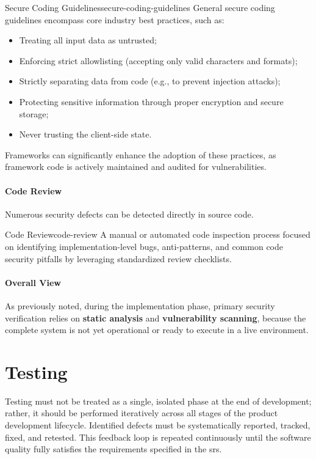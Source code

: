 \begin{concept}{Secure Coding Guidelines}{secure-coding-guidelines}
    General secure coding guidelines encompass core industry best practices, such as:
    \begin{itemize}
        \item Treating all input data as untrusted;
        \item Enforcing strict allowlisting (accepting only valid characters and formats);
        \item Strictly separating data from code (e.g., to prevent injection attacks);
        \item Protecting sensitive information through proper encryption and secure storage;
        \item Never trusting the client-side state.
    \end{itemize}
    Frameworks can significantly enhance the adoption of these practices, as framework code is actively maintained and audited for vulnerabilities.
\end{concept}

\paragraph{Code Review} Numerous security defects can be detected directly in source code. 

\begin{definition}{Code Review}{code-review}
    A manual or automated code inspection process focused on identifying implementation-level bugs, anti-patterns, and common code security pitfalls by leveraging standardized review checklists.
\end{definition}

\paragraph{Overall View} As previously noted, during the implementation phase, primary security verification relies on \textbf{static analysis} and \textbf{vulnerability scanning}, because the complete system is not yet operational or ready to execute in a live environment.

\section{Testing}
Testing must not be treated as a single, isolated phase at the end of development; rather, it should be performed iteratively across all stages of the product development lifecycle. Identified defects must be systematically reported, tracked, fixed, and retested. This feedback loop is repeated continuously until the software quality fully satisfies the requirements specified in the \gls{srs}. 

